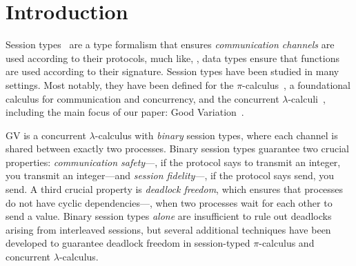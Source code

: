 \section{Introduction}
Session types~\cite{honda93,takeuchihonda94,hondavasconcelos98} are a type formalism that ensures \emph{communication channels} are used according to their protocols, much like, \eg, data types ensure that functions are used according to their signature. Session types have been studied in many settings. Most notably, they have been defined for the $\pi$-calculus~\cite{honda93,takeuchihonda94,hondavasconcelos98}, a foundational calculus for communication and concurrency, and the concurrent $\lambda$-calculi~\cite{gayvasconcelos10}, including the main focus of our paper: Good Variation~\cite[GV]{wadler15,lindleymorris15}.

GV is a concurrent $\lambda$-calculus with \emph{binary} session types, where each channel is shared between exactly two processes. Binary session types guarantee two crucial properties: \emph{communication safety}---\eg, if the protocol says to transmit an integer, you transmit an integer---and \emph{session fidelity}---\eg, if the protocol says send, you send. A third crucial property is \emph{deadlock freedom}, which ensures that processes do not have cyclic dependencies---\eg, when two processes wait for each other to send a value. Binary session types \emph{alone} are insufficient to rule out deadlocks arising from interleaved sessions, but several additional techniques have been developed to guarantee deadlock freedom in session-typed $\pi$-calculus and concurrent $\lambda$-calculus.

